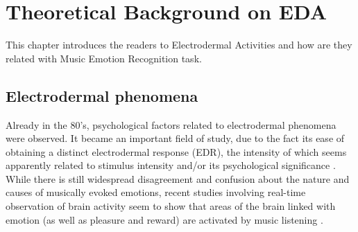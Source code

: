 \chapter{Theoretical Background on EDA}
\label{chap:TheoreticalBackgroundEDA}
\pagestyle{plain}
\vspace{0.5cm}

\noindent This chapter introduces the readers to Electrodermal Activities and how are they related with Music Emotion Recognition task.

\section{Electrodermal phenomena}
Already in the 80's, psychological factors related to electrodermal phenomena were observed. It became an important field of study, due to the fact its ease of obtaining a distinct electrodermal response (EDR), the intensity of which seems apparently related to stimulus intensity and/or its psychological significance \cite{boucsein2012electrodermal}.
\\ \indent
While there is still widespread disagreement and confusion about the nature and causes of musically evoked emotions, recent studies involving real-time observation of brain activity seem to show that areas of the brain linked with emotion (as well as pleasure and reward) are activated by music listening \cite{trost2012mapping}.

